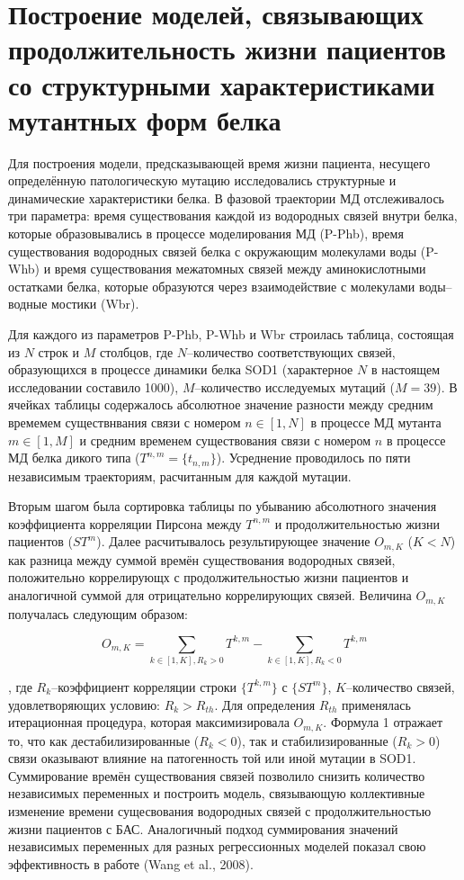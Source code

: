 \section{Построение моделей, связывающих продолжительность жизни пациентов со структурными характеристиками мутантных форм белка} \label{sect_MD_models}

Для построения модели, предсказывающей время жизни пациента, несущего определённую патологическую мутацию исследовались структурные и динамические характеристики белка. В фазовой траектории МД отслеживалось три параметра:  время существования каждой из водородных связей внутри белка, которые образовывались в процессе моделирования МД (P-Phb), время существования водородных связей белка с окружающим молекулами воды (P-Whb) и время существования межатомных связей между аминокислотными остатками белка, которые образуются через взаимодействие с молекулами воды--водные мостики (Wbr).

Для каждого из параметров P-Phb, P-Whb и Wbr строилась таблица, состоящая из $N$ строк и $M$ столбцов, где $N$--количество  соответствующих связей, образующихся в процессе динамики белка SOD1 (характерное $N$ в настоящем исследовании составило 1000), $M$--количество исследуемых мутаций ($M = 39$). В ячейках таблицы содержалось абсолютное значение разности между средним времемем существнвания связи с номером $n\in{\left [ 1,N \right ]}$ в процессе МД мутанта $m\in{\left [ 1,M \right ]}$ и средним временем существования связи с номером $n$ в процессе МД белка дикого типа ($T^{n,m}=\lbrace t_{n,m} \rbrace$). Усреднение проводилось по пяти независимым траекториям, расчитанным для каждой мутации.

Вторым шагом была сортировка таблицы по убыванию абсолютного значения коэффициента корреляции Пирсона между $T^{n,m}$ и продолжительностью жизни пациентов (${ST}^m$). Далее расчитывалось результирующее значение $O_{m, K}$ ($K < N$) как разница между суммой времён существования водородных связей, положительно коррелирующх с продолжительностью жизни пациентов и аналогичной суммой для отрицательно коррелирующих связей. Величина $O_{m, K}$ получалась следующим образом:

\begin{equation}
O_{m, K} = \sum_{k \in \left [ 1,K \right ], R_k > 0}{T^{k, m}}-\sum_{k \in \left [ 1,K \right ], R_k < 0}{T^{k, m}}
\end{equation}

, где $R_k$--коэффициент корреляции строки $\{T^{k,m}\}$ с $\{{ST}^m\}$, $K$--количество связей, удовлетворяющих условию: $R_k > R_{th}$. Для определения $R_{th}$ применялась итерационная процедура, которая максимизировала $O_{m, K}$. 
Формула 1 отражает то, что как дестабилизированные ($R_k < 0$), так и стабилизированные ($R_k > 0$) связи оказывают влияние на патогенность той или иной мутации в SOD1. Суммирование времён существования связей позволило снизить количество независимых переменных и построить модель, связывающую  коллективные изменение времени сущесвования водородных связей с продолжительностью жизни пациентов с БАС. Аналогичный подход суммирования значений независимых переменных для разных регрессионных моделей показал свою эффективность в работе (Wang et al., 2008).

